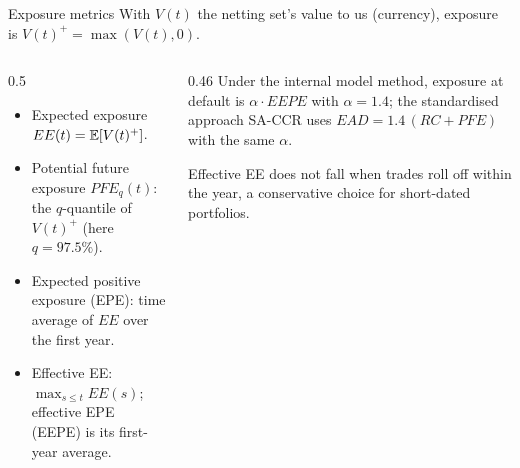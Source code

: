 \documentclass[aspectratio=169,10pt]{beamer}
\begin{document}
\begin{frame}{Exposure metrics}
  \small
  With $V(t)$ the netting set's value to us (currency), exposure is $V(t)^+ = \max(V(t), 0)$.
  \begin{columns}[T]
    \begin{column}{0.5\textwidth}
      \begin{itemize}
        \item Expected exposure $EE(t) = \mathbb{E}[V(t)^+]$.
        \item Potential future exposure $PFE_q(t)$: the $q$-quantile of $V(t)^+$ (here $q = 97.5\%$).
        \item Expected positive exposure (EPE): time average of $EE$ over the first year.
        \item Effective EE: $\max_{s \le t} EE(s)$; effective EPE (EEPE) is its first-year average.
      \end{itemize}
    \end{column}
    \begin{column}{0.46\textwidth}
      Under the internal model method, exposure at default is $\alpha \cdot EEPE$ with $\alpha = 1.4$; the standardised approach SA-CCR uses $EAD = 1.4\,(RC + PFE)$ with the same $\alpha$.
      \vspace{0.3em}

      Effective EE does not fall when trades roll off within the year, a conservative choice for short-dated portfolios.
    \end{column}
  \end{columns}
\end{frame}
\end{document}
